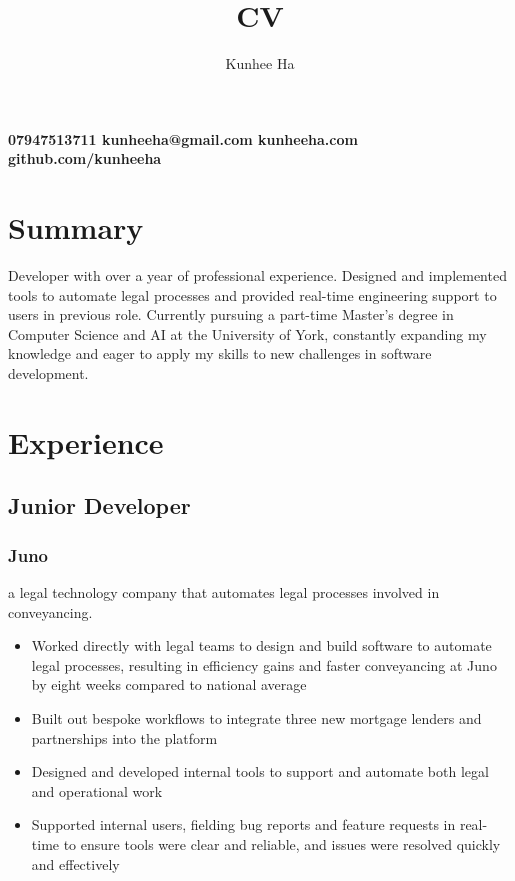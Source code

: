 \documentclass{article}
\renewcommand{\maketitle}{
  {\noindent\rmfamily\Huge\bfseries\MakeUppercase\theauthor}
  \vspace{.8em}
  }
\newcommand{\contacts}[4]{
  {\noindent\rmfamily\small\color{BodyGrey}\bfseries
    {\color{LightGrey}\faPhone}\hspace{5pt}#1\hspace{12pt}
    {\color{LightGrey}\faEnvelope}\hspace{5pt}#2\hspace{12pt}
    {\color{LightGrey}\faLink}\hspace{5pt}#3\hspace{12pt}
    {\color{LightGrey}\faGithub}\hspace{5pt}#4\hspace{12pt}
  }
}
\begin{document}
  \title{CV}
  \author{Kunhee Ha}

  \maketitle

\contacts
  {07947513711}
  {kunheeha@gmail.com}
  {kunheeha.com}
  {github.com/kunheeha}

\color{BodyGrey}
\begin{paracol}{2}
  \raggedright


  \section{Summary}
  Developer with over a year of professional experience. Designed and implemented tools to automate legal processes and provided real-time engineering support to users in previous role. Currently pursuing a part-time Master's degree in Computer Science and AI at the University of York, constantly expanding my knowledge and eager to apply my skills to new challenges in software development.

  \section{Experience}
  \subsection{Junior Developer}
  \subsubsection{Juno}
  {\color{LightGrey}\scriptsize\href{https://www.juno.legal}{\faExternalLink}}
  \hspace*{\fill}{\color{TitleGrey}{\scriptsize\faCalendar}\hspace{5pt}{\small10/2021 -- 12/2022}}
  
  {\noindent\small a legal technology company that automates legal processes involved in conveyancing.}
  \begin{itemize}[leftmargin=*]
    \item Worked directly with legal teams to design and build software to automate legal processes, resulting in efficiency gains and faster conveyancing at Juno by eight weeks compared to national average
    \item Built out bespoke workflows to integrate three new mortgage lenders and partnerships into the platform
    \item Designed and developed internal tools to support and automate both legal and operational work
    \item Supported internal users, fielding bug reports and feature requests in real-time to ensure tools were clear and reliable, and issues were resolved quickly and effectively
  \end{itemize}


\end{paracol}
\end{document}
